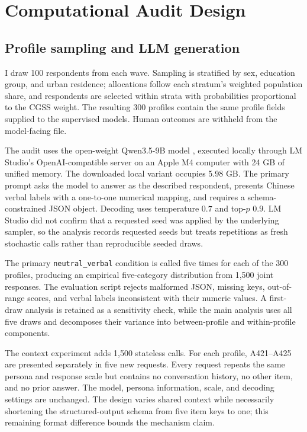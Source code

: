 \documentclass[11pt]{article}
\begin{document}
\section{Computational Audit Design}

\subsection{Profile sampling and LLM generation}
\label{sec:generation}

I draw 100 respondents from each wave. Sampling is stratified by sex, education group, and urban residence; allocations follow each stratum's weighted population share, and respondents are selected within strata with probabilities proportional to the CGSS weight. The resulting 300 profiles contain the same profile fields supplied to the supervised models. Human outcomes are withheld from the model-facing file.

The audit uses the open-weight Qwen3.5-9B model \citep{qwen2026modelcard}, executed locally through LM Studio's OpenAI-compatible server on an Apple M4 computer with 24 GB of unified memory. The downloaded local variant occupies 5.98 GB. The primary prompt asks the model to answer as the described respondent, presents Chinese verbal labels with a one-to-one numerical mapping, and requires a schema-constrained JSON object. Decoding uses temperature $0.7$ and top-$p$ $0.9$. LM Studio did not confirm that a requested seed was applied by the underlying sampler, so the analysis records requested seeds but treats repetitions as fresh stochastic calls rather than reproducible seeded draws.

The primary \texttt{neutral\_verbal} condition is called five times for each of the 300 profiles, producing an empirical five-category distribution from 1,500 joint responses. The evaluation script rejects malformed JSON, missing keys, out-of-range scores, and verbal labels inconsistent with their numeric values. A first-draw analysis is retained as a sensitivity check, while the main analysis uses all five draws and decomposes their variance into between-profile and within-profile components.

The context experiment adds 1,500 stateless calls. For each profile, A421--A425 are presented separately in five new requests. Every request repeats the same persona and response scale but contains no conversation history, no other item, and no prior answer. The model, persona information, scale, and decoding settings are unchanged. The design varies shared context while necessarily shortening the structured-output schema from five item keys to one; this remaining format difference bounds the mechanism claim.
\end{document}
